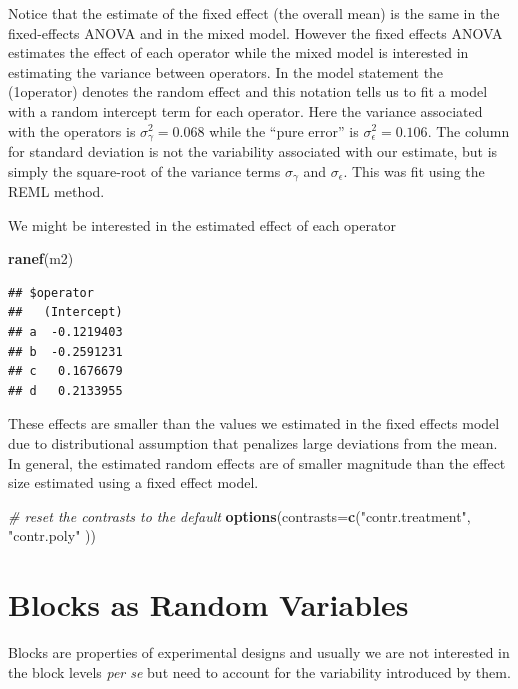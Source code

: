 \documentclass[]{book}
\newenvironment{Shaded}{\begin{snugshade}}{\end{snugshade}}
\newcommand{\KeywordTok}[1]{\textcolor[rgb]{0.13,0.29,0.53}{\textbf{{#1}}}}
\newcommand{\DataTypeTok}[1]{\textcolor[rgb]{0.13,0.29,0.53}{{#1}}}
\newcommand{\StringTok}[1]{\textcolor[rgb]{0.31,0.60,0.02}{{#1}}}
\newcommand{\CommentTok}[1]{\textcolor[rgb]{0.56,0.35,0.01}{\textit{{#1}}}}
\newcommand{\NormalTok}[1]{{#1}}
\theoremstyle{definition}
\theoremstyle{definition}
\theoremstyle{remark}
\begin{document}
Notice that the estimate of the fixed effect (the overall mean) is the
same in the fixed-effects ANOVA and in the mixed model. However the
fixed effects ANOVA estimates the effect of each operator while the
mixed model is interested in estimating the variance between operators.
In the model statement the (1\textbar{}operator) denotes the random
effect and this notation tells us to fit a model with a random intercept
term for each operator. Here the variance associated with the operators
is \(\sigma_{\gamma}^{2}=0.068\) while the ``pure error'' is
\(\sigma_{\epsilon}^{2}=0.106\). The column for standard deviation is
not the variability associated with our estimate, but is simply the
square-root of the variance terms \(\sigma_{\gamma}\) and
\(\sigma_{\epsilon}\). This was fit using the REML method.

We might be interested in the estimated effect of each operator

\begin{Shaded}
\begin{Highlighting}[]
\KeywordTok{ranef}\NormalTok{(m2)}
\end{Highlighting}
\end{Shaded}

\begin{verbatim}
## $operator
##   (Intercept)
## a  -0.1219403
## b  -0.2591231
## c   0.1676679
## d   0.2133955
\end{verbatim}

These effects are smaller than the values we estimated in the fixed
effects model due to distributional assumption that penalizes large
deviations from the mean. In general, the estimated random effects are
of smaller magnitude than the effect size estimated using a fixed effect
model.

\begin{Shaded}
\begin{Highlighting}[]
\CommentTok{# reset the contrasts to the default}
\KeywordTok{options}\NormalTok{(}\DataTypeTok{contrasts=}\KeywordTok{c}\NormalTok{(}\StringTok{"contr.treatment"}\NormalTok{, }\StringTok{"contr.poly"} \NormalTok{))}
\end{Highlighting}
\end{Shaded}

\section{Blocks as Random Variables}\label{blocks-as-random-variables}

Blocks are properties of experimental designs and usually we are not
interested in the block levels \emph{per se} but need to account for the
variability introduced by them.
\end{document}
